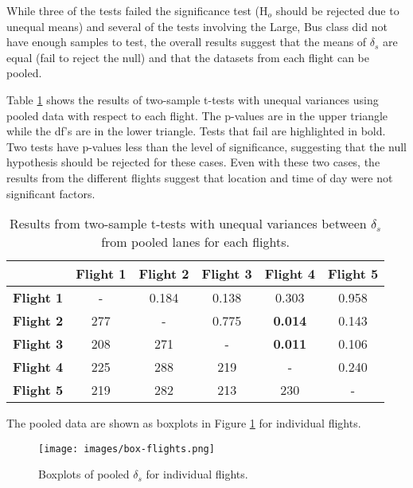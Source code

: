 While three of the tests failed the significance test (H$_{o}$ should be rejected due to unequal means) and several of the tests involving the Large, Bus class did not have enough samples to test, the overall results suggest that the means of $\delta_{s}$ are equal (fail to reject the null) and that the datasets from each flight can be pooled.

Table \ref{tab:lanepooled} shows the results of two-sample t-tests with unequal variances using pooled data with respect to each flight. The p-values are in the upper triangle while the df's are in the lower triangle. Tests that fail are highlighted in bold. Two tests have p-values less than the level of significance, suggesting that the null hypothesis should be rejected for these cases. Even with these two cases, the results from the different flights suggest that location and time of day were not significant factors.

\begin{table}[H]
\centering
\caption{Results from two-sample t-tests with unequal variances between $\delta_{s}$ from pooled lanes for each flights.}
\label{tab:lanepooled}
\begin{tabular}{@{}lccccc@{}}
\toprule
 & \textbf{Flight 1} & \textbf{Flight 2} & \textbf{Flight 3} & \textbf{Flight 4} & \textbf{Flight 5} \\ \midrule
\textbf{Flight 1} & - & 0.184 & 0.138 & 0.303 & 0.958 \\
\textbf{Flight 2} & 277 & - & 0.775 & \textbf{0.014} & 0.143 \\
\textbf{Flight 3} & 208 & 271 & - & \textbf{0.011} & 0.106 \\
\textbf{Flight 4} & 225 & 288 & 219 & - & 0.240 \\
\textbf{Flight 5} & 219 & 282 & 213 & 230 & - \\ \bottomrule
\end{tabular}
\end{table}

The pooled data are shown as boxplots in Figure \ref{fig:box-flights} for individual flights.

\begin{figure}[H]
\centering
\texttt{[image: images/box-flights.png]} 
\caption{Boxplots of pooled $\delta_{s}$ for individual flights.}
\label{fig:box-flights}
\end{figure}

